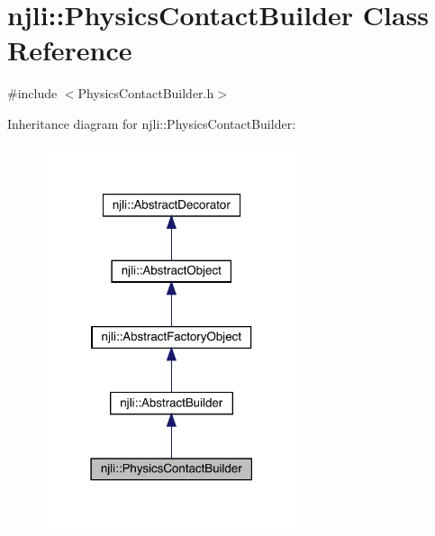 \hypertarget{classnjli_1_1_physics_contact_builder}{}\section{njli\+:\+:Physics\+Contact\+Builder Class Reference}
\label{classnjli_1_1_physics_contact_builder}


{\ttfamily \#include $<$Physics\+Contact\+Builder.\+h$>$}



Inheritance diagram for njli\+:\+:Physics\+Contact\+Builder\+:\nopagebreak
\begin{figure}[H]
\begin{center}
\leavevmode
\includegraphics[width=214pt]{classnjli_1_1_physics_contact_builder__inherit__graph}
\end{center}
\end{figure}


